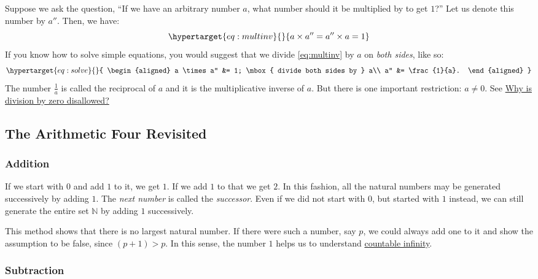 \documentclass[
  a4paper,
]{article}
\begin{document}
Suppose we ask the question, ``If we have an arbitrary number \(a\),
what number should it be multiplied by to get \(1\)?'' Let us denote
this number by \(a''\). Then, we have:
\begin{equation}\protect\hypertarget{eq:multinv}{}{
a \times a'' = a'' \times a = 1
}\label{eq:multinv}\end{equation} If you know how to solve simple
equations, you would suggest that we divide \cref{eq:multinv} by \(a\)
on \emph{both sides}, like so:
\begin{equation}\protect\hypertarget{eq:solve}{}{
\begin{aligned}
a \times a'' &= 1; \mbox{ divide both sides by } a\\
a'' &= \frac{1}{a}.
\end{aligned}
}\label{eq:solve}\end{equation} The number \(\frac{1}{a}\) is called the
reciprocal of \(a\) and it is the multiplicative inverse of \(a\). But
there is one important restriction: \(a \ne 0\). See
\protect\hyperlink{why-is-division-by-zero-disallowed}{Why is division
by zero disallowed?}

\hypertarget{the-arithmetic-four-revisited}{%
\subsection{The Arithmetic Four
Revisited}\label{the-arithmetic-four-revisited}}

\hypertarget{addition}{%
\subsubsection{Addition}\label{addition}}

If we start with \(0\) and add \(1\) to it, we get \(1\). If we add
\(1\) to that we get \(2\). In this fashion, all the natural numbers may
be generated successively by adding \(1\). The \emph{next number} is
called the \emph{successor}. Even if we did not start with \(0\), but
started with \(1\) instead, we can still generate the entire set
\(\mathbb{N}\) by adding \(1\) successively.

This method shows that there is no largest natural number. If there were
such a number, say \(p\), we could always add one to it and show the
assumption to be false, since \((p + 1) > p\). In this sense, the number
\(1\) helps us to understand
\href{https://mathinsight.org/definition/countably_infinite}{countable
infinity}.

\hypertarget{subtraction}{%
\subsubsection{Subtraction}\label{subtraction}}
\end{document}
